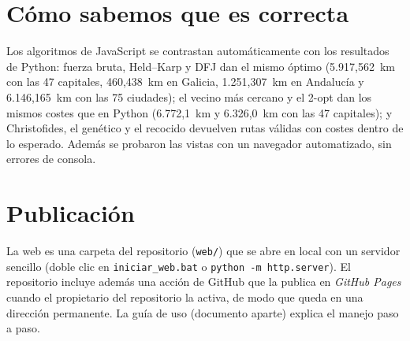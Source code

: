 \section{Cómo sabemos que es correcta}

Los algoritmos de JavaScript se contrastan automáticamente con los resultados de Python: fuerza bruta, Held--Karp y DFJ dan el mismo óptimo (5.917,562~km con las 47 capitales, 460,438~km en Galicia, 1.251,307~km en Andalucía y 6.146,165~km con las 75 ciudades);
el vecino más cercano y el 2-opt dan los mismos costes que en Python (6.772,1~km y 6.326,0~km con las 47 capitales); y Christofides, el genético y el recocido devuelven rutas válidas con costes dentro de lo esperado. Además se probaron las vistas con un navegador automatizado, sin errores de consola.

\section{Publicación}

La web es una carpeta del repositorio (\texttt{web/}) que se abre en local con un servidor sencillo (doble clic en \texttt{iniciar\_web.bat} o \texttt{python -m http.server}). El repositorio incluye además una acción de GitHub que la publica en \emph{GitHub Pages} cuando
el propietario del repositorio la activa, de modo que queda en una dirección permanente. La guía de uso (documento aparte) explica el manejo paso a paso.
